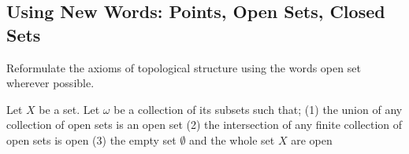 \subsection{Using New Words: Points, Open Sets, Closed Sets}
\begin{majorEx} %
  Reformulate the axioms of topological structure using the words open
  set wherever possible.
\end{majorEx}
Let $X$ be a set. Let $\omega$ be a collection of its subsets such that;
(1) the union of any collection of open sets is an open set
(2) the intersection of any finite collection of open sets is open
(3) the empty set $\emptyset$ and the whole set $X$ are open
